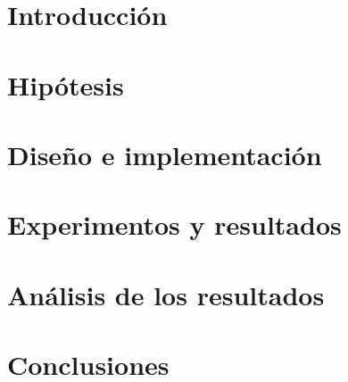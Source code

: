 \documentclass[14pt,letterpaper,hidelinks]{extarticle}
\begin{document}
\renewcommand{\sectionmark}[1]{\markright{\thesection.\ #1}}
\renewcommand{\headrulewidth}{0.5pt}

%

\begin{abstract}
\end{abstract}
\section{Introducción}

\section{Hipótesis}

\section{Diseño e implementación}

\section{Experimentos y resultados}


\section{Análisis de los resultados}

\section{Conclusiones}


%
%
%
\end{document}
